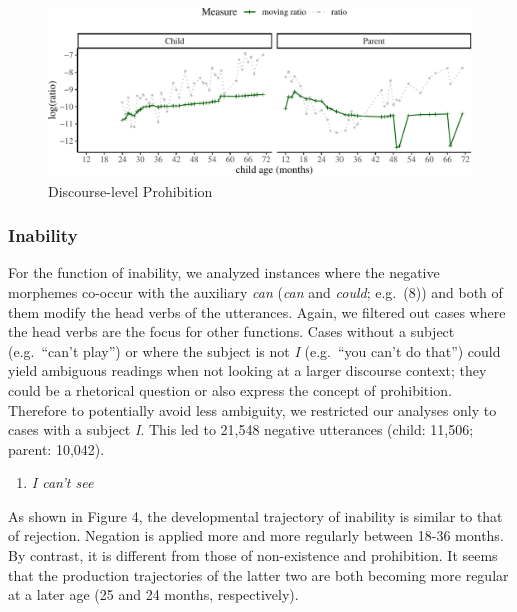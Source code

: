 \documentclass[
  english,
  man,floatsintext]{apa6}
\providecommand{\tightlist}{%
  \setlength{\itemsep}{0pt}\setlength{\parskip}{0pt}}
\begin{document}
\begin{figure}[H]

{\centering \includegraphics{neg_construction_article_files/figure-latex/prohibitiondiscourse-1} 

}

\caption{Discourse-level Prohibition}\label{fig:prohibitiondiscourse}
\end{figure}

\clearpage

\hypertarget{inability}{%
\subsubsection{Inability}\label{inability}}

For the function of inability, we analyzed instances where the negative morphemes co-occur with the auxiliary \emph{can} (\emph{can} and \emph{could}; e.g.~(8)) and both of them modify the head verbs of the utterances. Again, we filtered out cases where the head verbs are the focus for other functions. Cases without a subject (e.g.~``can't play'') or where the subject is not \emph{I} (e.g.~``you can't do that'') could yield ambiguous readings when not looking at a larger discourse context; they could be a rhetorical question or also express the concept of prohibition. Therefore to potentially avoid less ambiguity, we restricted our analyses only to cases with a subject \emph{I}. This led to 21,548 negative utterances (child: 11,506; parent: 10,042).

\begin{enumerate}
\def\labelenumi{(\arabic{enumi})}
\setcounter{enumi}{7}
\tightlist
\item
  \emph{I can't see}
\end{enumerate}

As shown in Figure 4, the developmental trajectory of inability is similar to that of rejection. Negation is applied more and more regularly between 18-36 months. By contrast, it is different from those of non-existence and prohibition. It seems that the production trajectories of the latter two are both becoming more regular at a later age (25 and 24 months, respectively).
\end{document}
